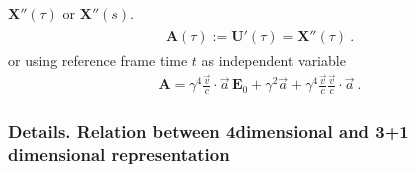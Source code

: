 \documentclass[letterpaper,10pt,english]{jupyterBook}
\begin{document}
\sphinxAtStartPar
{} \(\mathbf{X}''(\tau)\) or \(\mathbf{X}''(s)\).
\begin{equation*}
\begin{split}\begin{aligned}
  \mathbf{A}(\tau) := \mathbf{U}'(\tau) = \mathbf{X}''(\tau) \ .
\end{aligned}\end{split}
\end{equation*}
\sphinxAtStartPar
or using reference frame time \(t\) as independent variable
\begin{equation*}
\begin{split}\mathbf{A} = \gamma^4 \frac{\vec{v}}{c} \cdot\vec{a} \, \mathbf{E}_0 + \gamma^2 \vec{a} + \gamma^4 \frac{\vec{v}}{c} \frac{\vec{v}}{c} \cdot \vec{a} \ .\end{split}
\end{equation*}\subsubsection*{Details. Relation between 4\sphinxhyphen{}dimensional and 3+1 dimensional representation}
\end{document}
